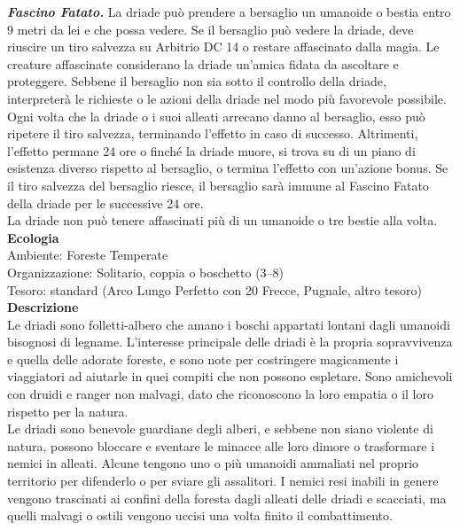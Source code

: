 \begin{multicols}{2}
\emph{\textbf{Fascino Fatato.}} La driade può prendere a bersaglio un umanoide o bestia entro 9 metri da lei e che possa vedere. Se il bersaglio può vedere la driade, deve riuscire un tiro salvezza su Arbitrio DC 14 o restare affascinato dalla magia. Le creature affascinate considerano la driade un'amica fidata da ascoltare e proteggere. Sebbene il bersaglio non sia sotto il controllo della driade, interpreterà le richieste o le azioni della driade nel modo più favorevole possibile.\\
Ogni volta che la driade o i suoi alleati arrecano danno al bersaglio, esso può ripetere il tiro salvezza, terminando l'effetto in caso di successo. Altrimenti, l'effetto permane 24 ore o finché la driade muore, si trova su di un piano di esistenza diverso rispetto al bersaglio, o termina l'effetto con un'azione bonus. Se il tiro salvezza del bersaglio riesce, il bersaglio sarà immune al Fascino Fatato della driade per le successive 24 ore.\\
La driade non può tenere affascinati più di un umanoide o tre bestie alla volta.\\
\textbf{Ecologia}\\
Ambiente: Foreste Temperate\\
Organizzazione: Solitario, coppia o boschetto (3–8)\\
Tesoro: standard (Arco Lungo Perfetto con 20 Frecce, Pugnale, altro tesoro)\\
\textbf{Descrizione}\\
Le driadi sono folletti-albero che amano i boschi appartati lontani dagli umanoidi bisognosi di legname. L’interesse principale delle driadi è la propria sopravvivenza e quella delle adorate foreste, e sono note per costringere magicamente i viaggiatori ad aiutarle in quei compiti che non possono espletare. Sono amichevoli con druidi e ranger non malvagi, dato che riconoscono la loro empatia o il loro rispetto per la natura.\\
Le driadi sono benevole guardiane degli alberi, e sebbene non siano violente di natura, possono bloccare e sventare le minacce alle loro dimore o trasformare i nemici in alleati. Alcune tengono uno o più umanoidi ammaliati nel proprio territorio per difenderlo o per sviare gli assalitori. I nemici resi inabili in genere vengono trascinati ai confini della foresta dagli alleati delle driadi e scacciati, ma quelli malvagi o ostili vengono uccisi una volta finito il combattimento.\\


\end{multicols}
